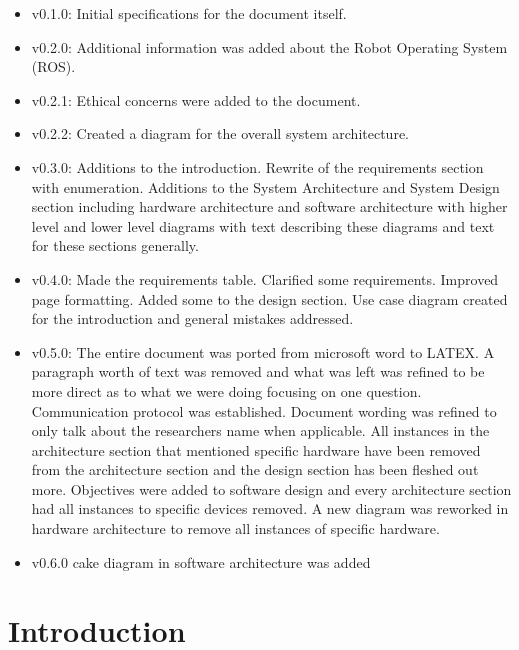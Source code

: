 \documentclass[english,12pt]{article}
\begin{document}
\begin{itemize}
	\item v0.1.0: Initial specifications for the document itself.
    \item v0.2.0: Additional information was added about the Robot 
    Operating System (ROS).
    \item v0.2.1: Ethical concerns were added to the document.
    \item v0.2.2: Created a diagram for the overall system architecture.
    \item v0.3.0: Additions to the introduction. Rewrite of the requirements section with
    enumeration. Additions to the System Architecture and System Design
    section including hardware architecture and software architecture with
    higher level and lower level diagrams with text describing these diagrams
    and text for these sections generally.
    \item v0.4.0: Made the requirements table. Clarified some requirements. Improved page
    formatting. Added some to the design section. Use case diagram created for
    the introduction and general mistakes addressed.
    \item v0.5.0: The entire document was ported from microsoft word to LATEX.
    A paragraph worth of text was removed and what was left was refined to be more direct 
    as to what we were doing focusing on one question. Communication protocol was established.
    Document wording was refined to only talk about the researchers name when applicable.
    All instances in the architecture section that mentioned specific hardware have been 
    removed from the architecture section and the design section has been fleshed out more.
    Objectives were added to software design and every architecture section had all instances to 
    specific devices removed. A new diagram was reworked in hardware architecture to remove all 
    instances of specific hardware.
    \item v0.6.0 cake diagram in software architecture was added
\end{itemize}
\newpage
\section{Introduction}
\end{document}
